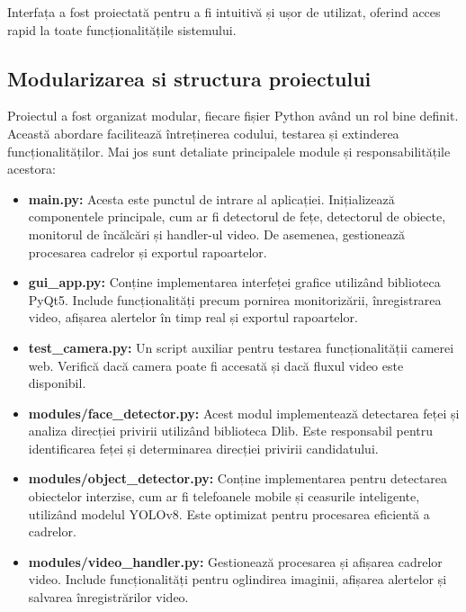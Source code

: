 \documentclass[12pt,a4paper]{article}
\begin{document}
Interfața a fost proiectată pentru a fi intuitivă și ușor de utilizat, oferind acces rapid la toate funcționalitățile sistemului.

\subsection{Modularizarea si structura proiectului}

\hspace{6mm}Proiectul a fost organizat modular, fiecare fișier Python având un rol bine definit. Această abordare facilitează întreținerea codului, testarea și extinderea funcționalităților. Mai jos sunt detaliate principalele module și responsabilitățile acestora:

\begin{itemize}
    \item \textbf{main.py:} Acesta este punctul de intrare al aplicației. Inițializează componentele principale, cum ar fi detectorul de fețe, detectorul de obiecte, monitorul de încălcări și handler-ul video. De asemenea, gestionează procesarea cadrelor și exportul rapoartelor.

    \item \textbf{gui\_app.py:} Conține implementarea interfeței grafice utilizând biblioteca PyQt5. Include funcționalități precum pornirea monitorizării, înregistrarea video, afișarea alertelor în timp real și exportul rapoartelor.
    
    \item \textbf{test\_camera.py:} Un script auxiliar pentru testarea funcționalității camerei web. Verifică dacă camera poate fi accesată și dacă fluxul video este disponibil.

    \item \textbf{modules/face\_detector.py:} Acest modul implementează detectarea feței și analiza direcției privirii utilizând biblioteca Dlib. Este responsabil pentru identificarea feței și determinarea direcției privirii candidatului.

    \item \textbf{modules/object\_detector.py:} Conține implementarea pentru detectarea obiectelor interzise, cum ar fi telefoanele mobile și ceasurile inteligente, utilizând modelul YOLOv8. Este optimizat pentru procesarea eficientă a cadrelor.

    \item \textbf{modules/video\_handler.py:} Gestionează procesarea și afișarea cadrelor video. Include funcționalități pentru oglindirea imaginii, afișarea alertelor și salvarea înregistrărilor video.


\end{itemize}
\end{document}
